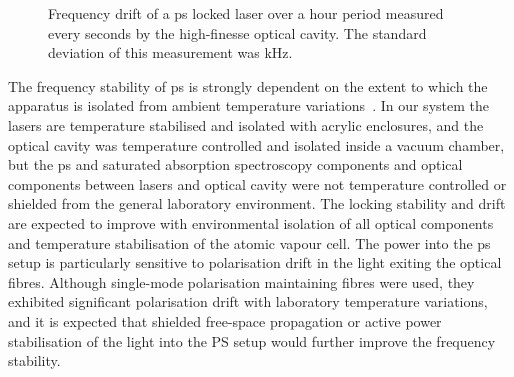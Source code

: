 \begin{figure}
\center

\caption[Long-term frequency drift of a laser locked with polarisation spectroscopy.]{Frequency drift of a \gls{ps} locked laser over a \unit[60]{hour} period measured every \unit[10]{seconds} by the high-finesse optical cavity. The standard deviation of this measurement was \unit[51]{kHz}.}
\label{figure:ps_drift}
\end{figure}

The frequency stability of \gls{ps} is strongly dependent on the extent to which the apparatus is isolated from ambient temperature variations~\cite{yoshikawa_frequency_2003}.
In our system the lasers are temperature stabilised and isolated with acrylic enclosures, and the optical cavity was temperature controlled and isolated inside a vacuum chamber, but the \gls{ps} and saturated absorption spectroscopy components and optical components between lasers and optical cavity were not temperature controlled or shielded from the general laboratory environment.
The locking stability and drift are expected to improve with environmental isolation of all optical components and temperature stabilisation of the atomic vapour cell.
The power into the \gls{ps} setup is particularly sensitive to polarisation drift in the light exiting the optical fibres.
Although single-mode polarisation maintaining fibres were used, they exhibited significant polarisation drift with laboratory temperature variations, and it is expected that shielded free-space propagation or active power stabilisation of the light into the PS setup would further improve the frequency stability.